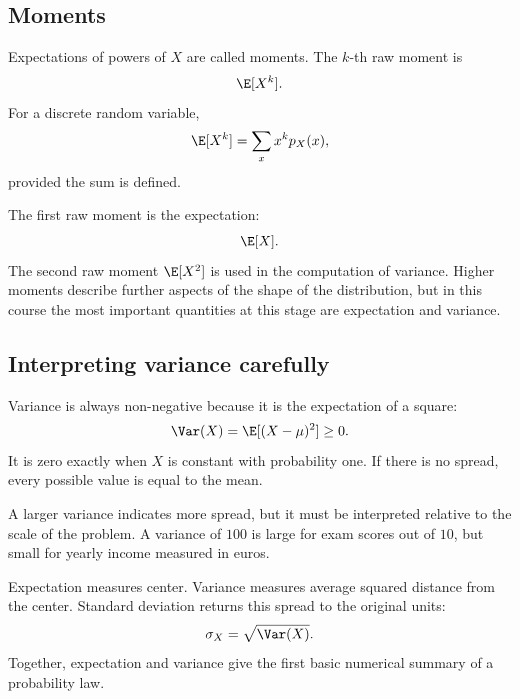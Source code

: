 \subsection*{Moments}

Expectations of powers of \(X\) are called moments. The \(k\)-th raw moment is
\[
\E[X^k].
\]
For a discrete random variable,
\[
\E[X^k]=\sum_x x^k p_X(x),
\]
provided the sum is defined.

The first raw moment is the expectation:
\[
\E[X].
\]
The second raw moment \(\E[X^2]\) is used in the computation of variance. Higher
moments describe further aspects of the shape of the distribution, but in this
course the most important quantities at this stage are expectation and variance.

\subsection*{Interpreting variance carefully}

Variance is always non-negative because it is the expectation of a square:
\[
\Var(X)=\E[(X-\mu)^2]\geq 0.
\]
It is zero exactly when \(X\) is constant with probability one. If there is no
spread, every possible value is equal to the mean.

A larger variance indicates more spread, but it must be interpreted relative to
the scale of the problem. A variance of \(100\) is large for exam scores out of
\(10\), but small for yearly income measured in euros.

\begin{summarybox}
Expectation measures center. Variance measures average squared distance from the
center. Standard deviation returns this spread to the original units:
\[
\sigma_X=\sqrt{\Var(X)}.
\]
Together, expectation and variance give the first basic numerical summary of a
probability law.
\end{summarybox}
